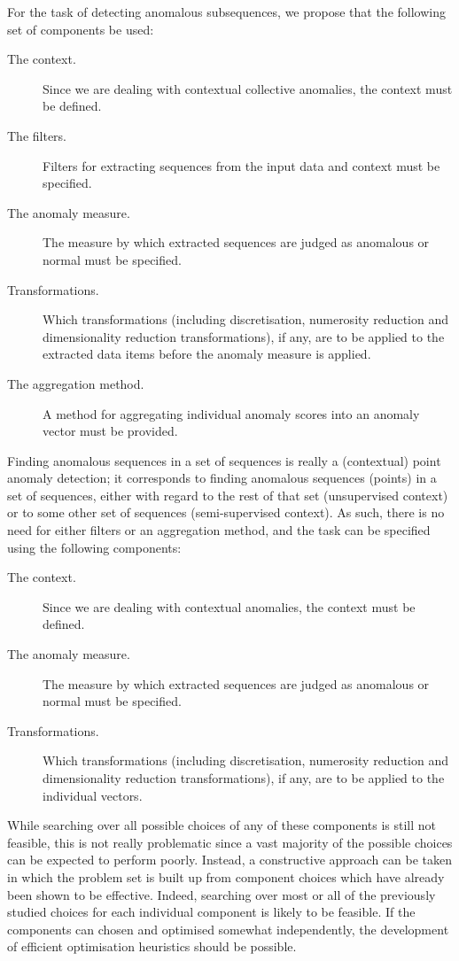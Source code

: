 For the task of detecting anomalous subsequences, we propose that the following set of components be used:
\begin{description}
  \item[The context.] Since we are dealing with contextual collective anomalies, the context must be defined.
  \item[The filters.] Filters for extracting sequences from the input data and context must be specified.
  \item[The anomaly measure.] The measure by which extracted sequences are judged as anomalous or normal must be specified.
  \item[Transformations.] Which transformations (including discretisation, numerosity reduction and dimensionality reduction transformations), if any, are to be applied to the extracted data items before the anomaly measure is applied.
  \item[The aggregation method.] A method for aggregating individual anomaly scores into an anomaly vector must be provided.
\end{description}

Finding anomalous sequences in a set of sequences is really a (contextual) point anomaly detection; it corresponds to finding anomalous sequences (points) in a set of sequences, either with regard to the rest of that set (unsupervised context) or to some other set of sequences (semi-supervised context). As such, there is no need for either filters or an aggregation method, and the task can be specified using the following components:
\begin{description}
  \item[The context.] Since we are dealing with contextual anomalies, the context must be defined.
  \item[The anomaly measure.] The measure by which extracted sequences are judged as anomalous or normal must be specified.
  \item[Transformations.] Which transformations (including discretisation, numerosity reduction and dimensionality reduction transformations), if any, are to be applied to the individual vectors.
\end{description}

While searching over all possible choices of any of these components is still not feasible, this is not really problematic since a vast majority of the possible choices can be expected to perform poorly. Instead, a constructive approach can be taken in which the problem set is built up from component choices which have already been shown to be effective. Indeed, searching over most or all of the previously studied choices for each individual component is likely to be feasible. If the components can chosen and optimised somewhat independently, the development of efficient optimisation heuristics should be possible.

